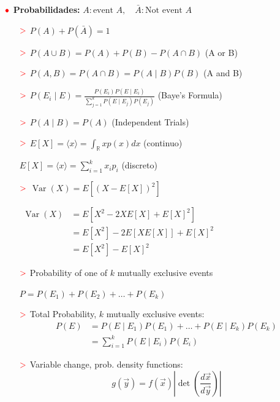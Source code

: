 \documentclass[%
 reprint,
 amsmath,amssymb,
 aps,
]{revtex4-1}
\begin{document}
\textbf{$\color{red}{\bullet}$ Probabilidades:} $A: \text{event }A, \quad \bar{A}: \text{Not event }A $
\begin{itemize}
  \item[$\textcolor{red}{\mathbf{>}}$] $P(A)+P(\bar{A})=1$
  \item[$\textcolor{red}{\mathbf{>}}$] $P(A \cup B)=P(A)+P(B)-P(A \cap B)$ (A or B)
  \item[$\textcolor{red}{\mathbf{>}}$] $P(A, B)=P(A \cap B)=P(A \mid B) P(B)$ (A and B)
  \item[$\textcolor{red}{\mathbf{>}}$] $P\left(E_{i} \mid E\right)=\frac{P\left(E_{i}\right) P\left(E \mid E_{i}\right)}{\sum_{j=1}^{k} P\left(E \mid E_{j}\right) P\left(E_{j}\right)}$ (Baye's Formula)
  \item[$\textcolor{red}{\mathbf{>}}$] $P(A \mid B)=P(A)$ (Independent Trials)

  \item[$\textcolor{red}{\mathbf{>}}$] 
  $E[X] =\langle x \rangle = \int_\mathbb{R} x p(x) dx$ (continuo)

  $E[X] =\langle x \rangle = \sum_{i=1}^k x_i p_i$ (discreto)
  
  \item[$\textcolor{red}{\mathbf{>}}$] 
  $\operatorname{Var}(X) =E\left[(X-E[X])^{2}\right]$

  $
  \begin{aligned}
  \operatorname{Var}(X) &=E\left[X^{2}-2 X E[X]+E[X]^{2}\right] \\
  &=E\left[X^{2}\right] - 2 E[X E[X] ] +E[X]^{2} \\
  &=E\left[X^{2}\right]-E[X]^{2}
  \end{aligned}
  $

  \item[$\textcolor{red}{\mathbf{>}}$] Probability of one of $k$ mutually exclusive events
  
  $
  P=P\left(E_{1}\right)+P\left(E_{2}\right)+\ldots+P\left(E_{k}\right)
  $
  
  \item[$\textcolor{red}{\mathbf{>}}$]
  Total Probability, $k$ mutually exclusive events:
  $$
  \begin{aligned}
    P(E)&=P\left(E \mid E_{1}\right) P\left(E_{1}\right)+\ldots+P\left(E \mid E_{k}\right) P\left(E_{k}\right)\\
    &=\sum_{i=1}^{k} P\left(E \mid E_{i}\right) P\left(E_{i}\right) 
  \end{aligned}
  $$

  \item[$\textcolor{red}{\mathbf{>}}$] Variable change, prob. density functions:
  $$
  g(\vec{y}) = f(\vec{x}) \left|{\det(\frac{d\vec{x}}{d\vec{y}})}\right|
  $$
\end{itemize}
\end{document}
